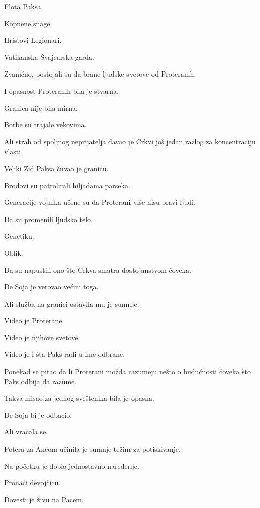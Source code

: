 Flota Paksa.

Kopnene snage.

Hristovi Legionari.

Vatikanska Švajcarska garda.

\bigskip

Zvanično, postojali su da brane ljudske svetove od Proteranih.

I opasnost Proteranih bila je stvarna.

Granica nije bila mirna.

Borbe su trajale vekovima.

Ali strah od spoljnog neprijatelja davao je Crkvi još jedan razlog za koncentraciju vlasti.

\bigskip

Veliki Zid Paksa čuvao je granicu.

Brodovi su patrolirali hiljadama parseka.

Generacije vojnika učene su da Proterani više nisu pravi ljudi.

Da su promenili ljudsko telo.

Genetiku.

Oblik.

Da su napustili ono što Crkva smatra dostojanstvom čoveka.

\bigskip

De Soja je verovao većini toga.

Ali služba na granici ostavila mu je sumnje.

Video je Proterane.

Video je njihove svetove.

Video je i šta Paks radi u ime odbrane.

\bigskip

Ponekad se pitao da li Proterani možda razumeju nešto o budućnosti čoveka što Paks odbija da razume.

Takva misao za jednog sveštenika bila je opasna.

De Soja bi je odbacio.

Ali vraćala se.

\bigskip

Potera za Aneom učinila je sumnje težim za potiskivanje.

\bigskip

Na početku je dobio jednostavno naređenje.

Pronaći devojčicu.

Dovesti je živu na Pacem.

\bigskip

